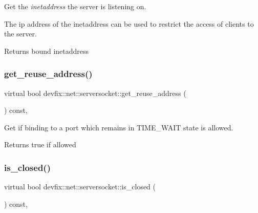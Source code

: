 Get the {\itshape inetaddress} the server is listening on. 

The ip address of the inetaddress can be used to restrict the access of clients to the server. \begin{DoxyReturn}{Returns}
bound inetaddress 
\end{DoxyReturn}
\mbox{\label{structdevfix_1_1net_1_1serversocket_a7efdb1f57d0e482542fda50a2403230d}} 
\subsubsection{\texorpdfstring{get\+\_\+reuse\+\_\+address()}{get\_reuse\_address()}}
{\footnotesize\ttfamily virtual bool devfix\+::net\+::serversocket\+::get\+\_\+reuse\+\_\+address (\begin{DoxyParamCaption}{ }\end{DoxyParamCaption}) const\hspace{0.3cm}{\ttfamily [pure virtual]}, {\ttfamily [noexcept]}}



Get if binding to a port which remains in T\+I\+M\+E\+\_\+\+W\+A\+IT state is allowed. 

\begin{DoxyReturn}{Returns}
true if allowed 
\end{DoxyReturn}
\mbox{\label{structdevfix_1_1net_1_1serversocket_a37cc4e3ecede2a0bc52f90e49fcbe4a9}} 
\subsubsection{\texorpdfstring{is\+\_\+closed()}{is\_closed()}}
{\footnotesize\ttfamily virtual bool devfix\+::net\+::serversocket\+::is\+\_\+closed (\begin{DoxyParamCaption}{ }\end{DoxyParamCaption}) const\hspace{0.3cm}{\ttfamily [pure virtual]}, {\ttfamily [noexcept]}}



